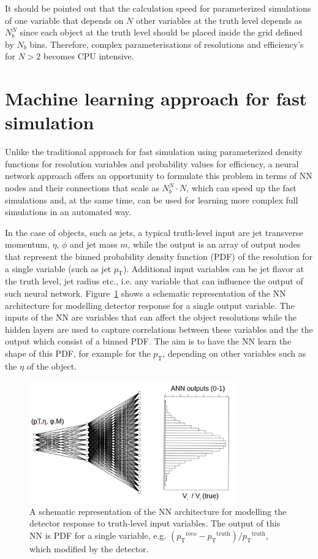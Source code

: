 \documentclass[showpacs,showkeys,preprint,prd,nofootinbib,linenumbers,12pt,superscriptaddress]{revtex4-1}
\def\pt{\ensuremath{p_{\mathrm{T}}}}
\def\ptRes{\ensuremath{(\pt^{\mathrm{reco}}-\pt^{\mathrm{truth}})/\pt^{\mathrm{truth}}}}
\begin{document}
It should be pointed out that the calculation speed for parameterized simulations of one variable that depends on $N$ other variables at the truth level depends  as $N_b^N$ since each object at the truth level should be placed inside the grid defined by $N_b$ bins. Therefore, complex parameterisations of resolutions and efficiency's for $N>2$ becomes CPU intensive. 

\section{Machine learning approach for fast simulation}

Unlike the traditional approach for fast simulation using parameterized density functions for resolution variables and probability values for efficiency, a neural network approach offers an opportunity to formulate this problem in terms of NN nodes and their connections that scale as $N_b^N \cdot N$, which can speed up the fast simulations and, at the same time, can be used for learning more complex full simulations in an automated way.

In the case of objects, such as jets, a typical truth-level input are jet transverse momentum, $\eta$, $\phi$ and jet mass $m$, while the output
is an array of output nodes that represent the binned probability density function (PDF) of the resolution for a single variable (such as jet \pt). Additional input variables can be jet flavor at the truth level, jet radius etc., i.e. any variable that 
can influence the output of such neural network. Figure~\ref{ann_example} shows a schematic representation of the NN architecture for modelling detector response for a single output variable. The inputs of the NN are variables that can affect the object resolutions while the hidden layers are used to capture correlations between these variables and the the output which consist of a binned PDF. The aim is to have the NN learn the shape of this PDF, for example for the $\pt$, depending on other variables such as the $\eta$ of the object.

\begin{figure}[h]
  \includegraphics[width=0.8\textwidth]{figures/intro/nn_example.png}
  \caption{A schematic representation of the NN architecture for modelling the detector response to truth-level input variables. The output of this NN is PDF for a single variable, e.g. \ptRes, which modified by the detector.}
  \label{ann_example}
\end{figure}
\end{document}
